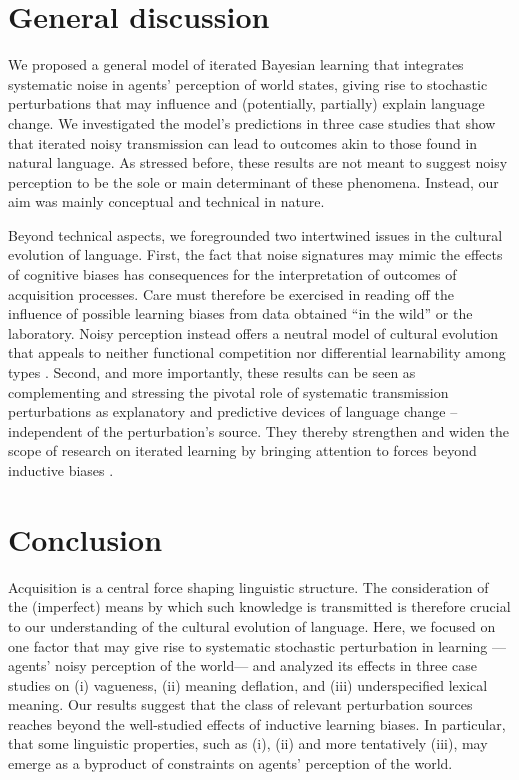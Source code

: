\documentclass[10pt,a4paper]{article}
\begin{document}
\section{General discussion}
We proposed a general model of iterated Bayesian learning that integrates systematic noise in agents'
perception of world states, giving rise to stochastic perturbations that may influence and
(potentially, partially) explain language change. We investigated the model's predictions in
three case studies that show that iterated noisy transmission can lead to outcomes akin to
those found in natural language. As stressed before, these results are not meant to suggest
noisy perception to be the sole or main determinant of these phenomena. Instead, our aim was
mainly conceptual and technical in nature.

Beyond technical aspects, we foregrounded two intertwined issues in the cultural evolution of
language. First, the fact that noise signatures may mimic the effects of cognitive biases has
consequences for the interpretation of outcomes of acquisition processes. Care must
therefore be exercised in reading off the influence of possible learning biases from
data obtained ``in the wild'' or the laboratory. Noisy perception instead offers a neutral
model of cultural evolution that appeals to neither functional
competition nor differential learnability among types \citep{reali+griffiths:2009}. Second, and more importantly, these results can be seen as complementing and stressing the pivotal role of systematic transmission
perturbations as explanatory and predictive devices of language change -- independent of the
perturbation's source. They thereby strengthen and widen the scope of research on iterated
learning by bringing attention to forces beyond inductive biases \citep[cf.][]{perfors+navarro:2014}.


\section{Conclusion}
Acquisition is a central force shaping linguistic structure. The consideration of the
(imperfect) means by which such knowledge is transmitted is therefore crucial to our
understanding of the cultural evolution of language. Here, we focused on one factor that may
give rise to systematic stochastic perturbation in learning ---agents' noisy perception of the
world--- and analyzed its effects in three case studies on (i) vagueness, (ii) meaning
deflation, and (iii) underspecified lexical meaning. Our results suggest that the class of
relevant perturbation sources reaches beyond the well-studied effects of inductive learning
biases. In particular, that some linguistic properties, such as (i), (ii) and more tentatively
(iii), may emerge as a byproduct of constraints on agents' perception of the world.
\end{document}
